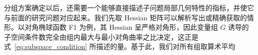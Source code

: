 分组方案确定以后，还需要一个能够直接描述子问题局部几何特性的指标，并使它与前面的研究问题对应起来。我们先取 Hessian 矩阵可以解析写出或精确获取的情形。以对角椭球函数 F1 为例，其 Hessian 呈严格对角形，因此变量组 $G$ 诱导的子空间条件数完全由组内最大与最小对角曲率之比决定，这正是式~\eqref{eq:subspace_condition} 所描述的量。基于此，我们对所有组取算术平均